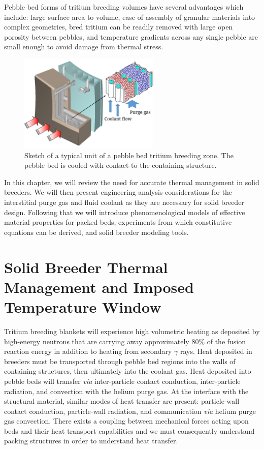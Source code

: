 \documentclass[11pt]{report} %
\begin{document}
Pebble bed forms of tritium breeding volumes have several advantages which include: large surface area to volume, ease of assembly of granular materials into complex geometries, bred tritium can be readily removed with large open porosity between pebbles, and temperature gradients across any single pebble are small enough to avoid damage from thermal stress.

\begin{figure}[ht]
	\centering
	\includegraphics[width=0.6\textwidth]{images/japanese-breeder-design} 
	\caption{Sketch of a typical unit of a pebble bed tritium breeding zone. The pebble bed is cooled with contact to the containing structure.}
	\label{fig:japanese-breeder-design}
\end{figure}

In this chapter, we will review the need for accurate thermal management in solid breeders. We will then present engineering analysis considerations for the interstitial purge gas and fluid coolant as they are necessary for solid breeder design. Following that we will introduce phenomenological models of effective material properties for packed beds, experiments from which constitutive equations can be derived, and solid breeder modeling tools.

\section{Solid Breeder Thermal Management and Imposed Temperature Window}

Tritium breeding blankets will experience high volumetric heating as deposited by high-energy neutrons that are carrying away approximately 80\% of the fusion reaction energy in addition to heating from secondary $\gamma$ rays. Heat deposited in breeders must be transported through pebble bed regions into the walls of containing structures, then ultimately into the coolant gas. Heat deposited into pebble beds will transfer \textit{via} inter-particle contact conduction, inter-particle radiation, and convection with the helium purge gas. At the interface with the structural material, similar modes of heat transfer are present: particle-wall contact conduction, particle-wall radiation, and communication \textit{via} helium purge gas convection. There exists a coupling between mechanical forces acting upon beds and their heat transport capabilities and we must consequently understand packing structures in order to understand heat transfer.
\end{document}
